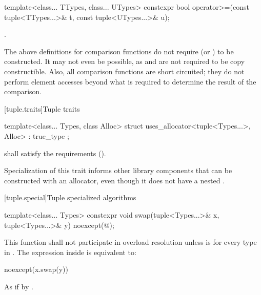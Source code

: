 %
\begin{itemdecl}
template<class... TTypes, class... UTypes>
  constexpr bool operator>=(const tuple<TTypes...>& t, const tuple<UTypes...>& u);
\end{itemdecl}

\begin{itemdescr}
\pnum\returns {}.
\end{itemdescr}

\pnum \begin{note} The above definitions for comparison functions
do not require 
(or ) to be constructed. It may not
even be possible, as  and  are not required to be copy
constructible. Also, all comparison functions are short circuited;
they do not perform element accesses beyond what is required to determine the
result of the comparison. \end{note}

[tuple.traits]{Tuple traits}

%
\begin{itemdecl}
template<class... Types, class Alloc>
  struct uses_allocator<tuple<Types...>, Alloc> : true_type { };
\end{itemdecl}

\begin{itemdescr}
\pnum
\requires {} shall satisfy the 
requirements ().

\pnum
\begin{note} Specialization of this trait informs other library components that
 can be constructed with an allocator, even though it does not have
a nested . \end{note}
\end{itemdescr}

[tuple.special]{Tuple specialized algorithms}

%
\begin{itemdecl}
template<class... Types>
  constexpr void swap(tuple<Types...>& x, tuple<Types...>& y) noexcept(@\seebelow@);
\end{itemdecl}

\begin{itemdescr}
\pnum
\remarks This function shall not participate in overload resolution
unless  is 
for every type  in .
The expression inside  is equivalent to:

\begin{codeblock}
noexcept(x.swap(y))
\end{codeblock}

\pnum
\effects As if by .
\end{itemdescr}

